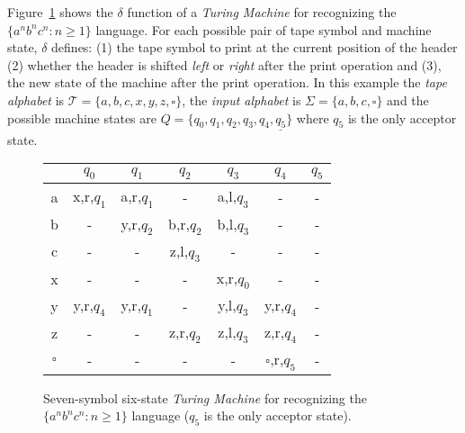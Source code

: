\documentclass[letterpaper]{article} %
\begin{document}
Figure~\ref{tab:tm-anbncn} shows the $\delta$ function of a {\em Turing Machine} for recognizing the $\{a^nb^nc^n : n \geq 1 \}$ language. For each possible pair of tape symbol and machine state, $\delta$ defines: (1) the tape symbol to print at the current position of the header (2) whether the header is shifted {\em left} or {\em right} after the print operation and (3), the new state of the machine after the print operation. In this example the {\em tape alphabet} is $\mathcal{T}=\{a,b,c,x,y,z,\square\}$, the {\em input alphabet} is $\Sigma=\{a,b,c,\square\}$ and the possible machine states are $Q=\{q_0,q_1,q_2,q_3,q_4,\underline{q_5}\}$ where \underline{$q_5$} is the only acceptor state.

\begin{figure}
\begin{center}
    \begin{tabular}{| c || c | c | c | c | c | c |}
    \hline
      & $q_0$ & $q_1$ & $q_2$ & $q_3$ & $q_4$ & \underline{$q_5$} \\ \hline\hline
    a & x,r,$q_1$ & a,r,$q_1$ & - &  a,l,$q_3$ & - & - \\ \hline
    b & - & y,r,$q_2$ & b,r,$q_2$ & b,l,$q_3$ & - & - \\ \hline
    c & - & - & z,l,$q_3$ & - & - & - \\ \hline
    x & - & - & - & x,r,$q_0$ & - & - \\ \hline
    y & y,r,$q_4$ & y,r,$q_1$ & - & y,l,$q_3$ & y,r,$q_4$ & - \\ \hline
    z & - & - & z,r,$q_2$ & z,l,$q_3$ & z,r,$q_4$ & - \\\hline
    $\square$ & - & - & - & - & $\square$,r,$q_5$  & - \\                
    \hline
    \end{tabular}
\end{center}
  \caption{\small Seven-symbol six-state {\em Turing Machine} for recognizing the $\{a^nb^nc^n : n \geq 1 \}$ language (\underline{$q_5$} is the only acceptor state).}
  \label{tab:tm-anbncn}
\end{figure}
\end{document}
